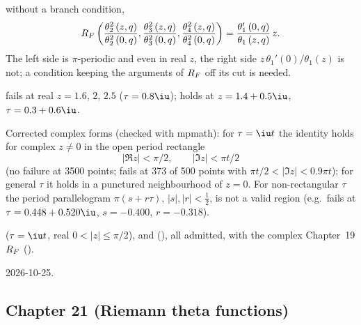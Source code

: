 \documentclass[11pt,a4paper]{article}
\newcounter{entry}
\newcommand{\entryprefix}{}
\renewcommand{\theentry}{\entryprefix\arabic{entry}}
\newcommand{\entry}[1]{\par\addvspace{1.2ex}\needspace{4\baselineskip}\noindent\refstepcounter{entry}%
  \textbf{\theentry}\enspace\textbf{#1}\par\nopagebreak}
\newenvironment{fields}{\begin{description}[font=\normalfont\itshape,
  leftmargin=1.5em, labelindent=0pt, itemsep=0.3ex, topsep=0.3ex, parsep=0.3ex]\setlength{\parindent}{0pt}\RaggedRight}{\end{description}}
\begin{document}
\entry{}
\begin{fields}
\item[Printed] without a branch condition,
\begin{equation*}
R_{F}\left(\frac{\theta_{2}^{2}\left(z,q\right)}{\theta_{2}^{2}\left(0,q\right)},
\frac{\theta_{3}^{2}\left(z,q\right)}{\theta_{3}^{2}\left(0,q\right)},
\frac{\theta_{4}^{2}\left(z,q\right)}{\theta_{4}^{2}\left(0,q\right)}\right)
=\frac{\theta_{1}'\left(0,q\right)}{\theta_{1}\left(z,q\right)}\,z.
\end{equation*}
The left side is $\pi$-periodic and even in real $z$, the right side
$z\,\theta_{1}'(0)/\theta_{1}(z)$ is not; a condition keeping the arguments of $R_{F}$ off its cut
is needed.
\item[Evidence] fails at real $z=1.6$, $2$, $2.5$ ($\tau=0.8\iu$); holds at $z=1.4+0.5\iu$,
$\tau=0.3+0.6\iu$.
\item[Correct] Corrected complex forms (checked with mpmath): for $\tau=\iu t$ the identity
holds for complex $z\ne0$ in the open period rectangle
\begin{equation*}
\lvert\Re z\rvert<\pi/2,\qquad \lvert\Im z\rvert<\pi t/2
\end{equation*}
(no failure at 3500 points; fails at 373 of 500 points with $\pi t/2<\lvert\Im z\rvert<0.9\pi t$);
for general $\tau$ it holds in a punctured neighbourhood of $z=0$. For non-rectangular $\tau$
the period parallelogram $\pi(s+r\tau)$, $\lvert s\rvert,\lvert r\rvert<\tfrac12$, is not a
valid region (e.g.\ fails at $\tau=0.448+0.520\iu$, $s=-0.400$, $r=-0.318$).
\item[Lean]  ($\tau=\iu t$, real $0<\lvert z\rvert\le\pi/2$),
 and 
(), all admitted, with the complex Chapter~19 $R_{F}$
().
\item[Found] 2026-10-25.
\end{fields}

\subsection{Chapter 21 (Riemann theta functions)}
\end{document}
